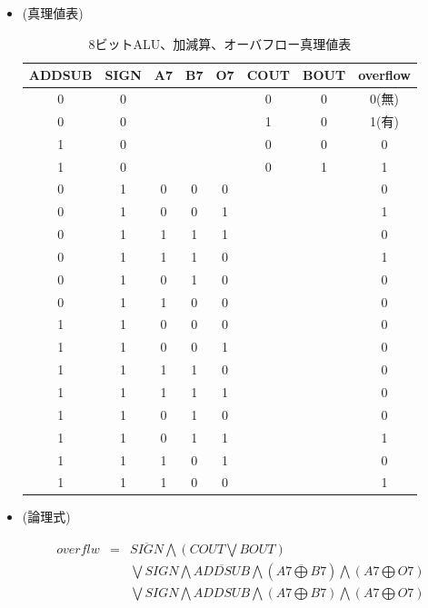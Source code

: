 \documentclass[11pt,a4j]{jsarticle}
\begin{document}
    \begin{itemize}
    
    \item (真理値表)
    
     \begin{table}[htb]
  \begin{center}
    \caption{8ビットALU、加減算、オーバフロー真理値表}
    \begin{tabular}{cc|ccc|cc|c} \toprule
ADDSUB & SIGN & A7 & B7 & O7 & COUT & BOUT & overflow \\ \midrule
0 & 0 &  &  &  & 0 & 0 & 0(無) \\
0 & 0 &  &  &  & 1 & 0 & 1(有) \\ \midrule
1 & 0 &  &  &  & 0 & 0 & 0 \\
1 & 0 &  &  &  & 0 & 1 & 1 \\ \midrule
0 & 1 & 0 & 0 & 0 &  &  & 0 \\
0 & 1 & 0 & 0 & 1 &  &  & 1 \\
0 & 1 & 1 & 1 & 1 &  &  & 0 \\
0 & 1 & 1 & 1 & 0 &  &  & 1 \\
0 & 1 & 0 & 1 & 0 &  &  & 0 \\
0 & 1 & 1 & 0 & 0 &  &  & 0 \\ \midrule
1 & 1 & 0 & 0 & 0 &  &  & 0 \\
1 & 1 & 0 & 0 & 1 &  &  & 0 \\
1 & 1 & 1 & 1 & 0 &  &  & 0 \\
1 & 1 & 1 & 1 & 1 &  &  & 0 \\
1 & 1 & 0 & 1 & 0 &  &  & 0 \\
1 & 1 & 0 & 1 & 1 &  &  & 1 \\
1 & 1 & 1 & 0 & 1 &  &  & 0 \\
1 & 1 & 1 & 0 & 0 &  &  & 1 \\ \bottomrule
    \end{tabular}
    \label{}
  \end{center}
 \end{table}
    
    \item (論理式)
    
    \begin{eqnarray}
    overflw &=& \overline{SIGN} \bigwedge (COUT \bigvee BOUT) \nonumber \\
                  && \bigvee SIGN \bigwedge \overline{ADDSUB} \bigwedge (\overline{A7 \bigoplus B7}) \bigwedge (A7 \bigoplus O7) \nonumber \\
                  && \bigvee SIGN \bigwedge ADDSUB \bigwedge (A7 \bigoplus B7) \bigwedge (A7 \bigoplus O7)
    \end{eqnarray}
    

\end{itemize}
\end{document}
